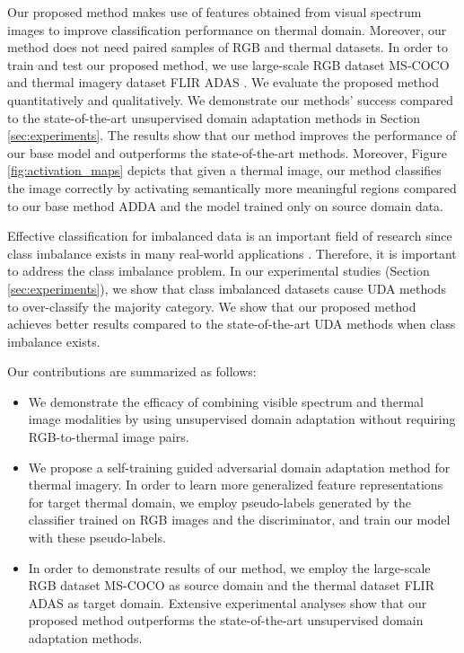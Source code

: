 \documentclass[final]{cvpr}
\begin{document}
Our proposed method makes use of features obtained from visual spectrum images to improve classification performance on thermal domain. Moreover, our method does not need paired samples of RGB and thermal datasets. In order to train and test our proposed method, we use large-scale RGB dataset MS-COCO \cite{mscoco} and thermal imagery dataset FLIR ADAS \cite{flir}. We evaluate the proposed method quantitatively and qualitatively. We demonstrate our methods' success compared to the state-of-the-art unsupervised domain adaptation methods in Section \ref{sec:experiments}. The results show that our method improves the performance of our base model and outperforms the state-of-the-art methods. Moreover, Figure \ref{fig:activation_maps} depicts that given a thermal image, our method classifies the image correctly by activating semantically more meaningful regions compared to our base method ADDA \cite{adda} and the model trained only on source domain data.
\vspace{2mm}

Effective classification for imbalanced data is an important field of research since class imbalance exists in many real-world applications \cite{buda2018systematic, classimbalance}. Therefore, it is important to address the class imbalance problem. In our experimental studies (Section \ref{sec:experiments}), we show that class imbalanced datasets cause UDA methods to over-classify the majority category. We show that our proposed method achieves better results compared to the state-of-the-art UDA methods when class imbalance exists.
\vspace{2mm}

Our contributions are summarized as follows:
\begin{itemize}
\item We demonstrate the efficacy of combining visible spectrum and thermal image modalities by using unsupervised domain adaptation without requiring RGB-to-thermal image pairs.
\item We propose a self-training guided adversarial domain adaptation method for thermal imagery. In order to learn more generalized feature representations for target thermal domain, we employ pseudo-labels generated by the classifier trained on RGB images and the discriminator, and train our model with these pseudo-labels.
\item In order to demonstrate results of our method, we employ the large-scale RGB dataset MS-COCO as source domain and the thermal dataset FLIR ADAS as target domain. Extensive experimental analyses show that our proposed method outperforms the state-of-the-art unsupervised domain adaptation methods.
\end{itemize}
\end{document}
